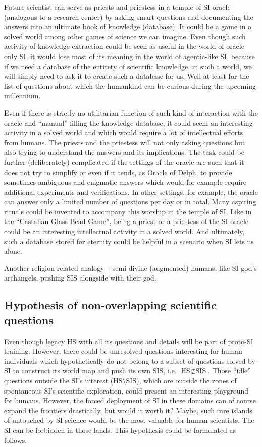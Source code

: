 \documentclass[a4paper,11pt]{article}
\begin{document}
Future scientist can serve as priests and priestess in a temple of SI oracle (analogous to a research center) by asking smart questions and documenting the answers into an ultimate book of knowledge (database). It could be a game in a solved world among other games of science we can imagine. Even though such activity of knowledge extraction could be seen as useful in the world of oracle only SI, it would lose most of its meaning in the world of agentic-like SI, because if we need a database of the entirety of scientific knowledge, in such a world, we will simply need to ask it to create such a database for us. Well at least for the list of questions about which the humankind can be curious during the upcoming millennium. 

Even if there is strictly no utilitarian function of such kind of interaction with the oracle and ``manual'' filling the knowledge database, it could seem an interesting activity in a solved world and which would require a lot of intellectual efforts from humans. The priests and the priestess will not only asking questions but also trying to understand the answers and its implications. The task could be further (deliberately) complicated if the settings of the oracle are such that it does not try to simplify or even if it tends, as Oracle of Delph, to provide sometimes ambiguous and enigmatic answers which would for example require additional experiments and verifications. In other settings, for example, the oracle can answer only a limited number of questions per day or in total. Many aspiring rituals could be invented to accompany this worship in the temple of SI. Like in the ``Castalian Glass Bead Game'', being a priest or a priestess of the SI oracle could be an interesting intellectual activity in a solved world. And ultimately, such a database stored for eternity could be helpful in a scenario when SI lets us alone.

Another religion-related analogy -- semi-divine (augmented) humans, like SI-god's archangels, pushing SIS alongside with their god.

\subsection{Hypothesis of non-overlapping scientific questions}

Even though legacy HS with all its questions and details will be part of proto-SI training.
However, there could be unresolved questions interesting for human individuals which hypothetically do not belong to a subset of questions solved by SI to construct its world map and push its own SIS, i.e. $\text{HS} \not\subset \text{SIS}$. Those ``idle'' questions outside the SI's interest ($\text{HS} \setminus \text{SIS}$), which are outside the zones of spontaneous SI's scientific exploration, could present an interesting playground for humans. However, the forced deployment of SI in these domains can of course expand the frontiers drastically, but would it worth it? Maybe, such rare islands of untouched by SI science would be the most valuable for human scientists. The SI can be forbidden in those lands. 
This hypothesis could be formulated as follows.
\end{document}
